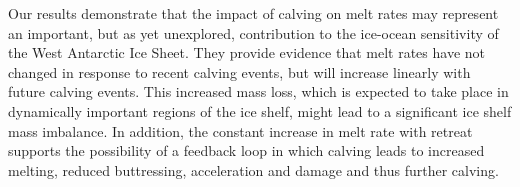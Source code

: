 \documentclass[draft]{agujournal2019}
\begin{document}
Our results demonstrate that the impact of calving on melt rates may represent an important, but as yet unexplored, contribution to the ice-ocean sensitivity of the West Antarctic Ice Sheet. They provide evidence that melt rates have not changed in response to recent calving events, but will increase linearly with future calving events. This increased mass loss, which is expected to take place  in dynamically important regions of the ice shelf, might lead to a significant ice shelf mass imbalance. In addition, the constant increase in melt rate with retreat supports the possibility of a feedback loop in which calving leads to increased melting, reduced buttressing, acceleration and damage and thus further calving.




%
\end{document}
